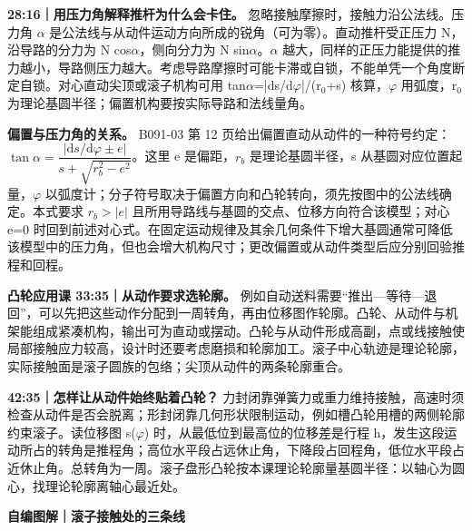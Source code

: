 \documentclass[zihao=5,a4paper,UTF8,fontset=fandol]{ctexart}
\begin{document}
\textbf{28:16｜用压力角解释推杆为什么会卡住。} 忽略接触摩擦时，接触力沿公法线。压力角 $\alpha$ 是公法线与从动件运动方向所成的锐角（可为零）。直动推杆受正压力 N，沿导路的分力为 N cos$\alpha$，侧向分力为 N sin$\alpha$。$\alpha$ 越大，同样的正压力能提供的推力越小，导路侧压力越大。考虑导路摩擦时可能卡滞或自锁，不能单凭一个角度断定自锁。对心直动尖顶或滚子机构可用 tan$\alpha$=|ds/d$\varphi$|/(r$_{0}$+s) 核算，$\varphi$ 用弧度，r$_{0}$ 为理论基圆半径；偏置机构要按实际导路和法线量角。


\textbf{偏置与压力角的关系。} B091-03 第 12 页给出偏置直动从动件的一种符号约定：$\tan\alpha=\dfrac{|\mathrm{d}s/\mathrm{d}\varphi\pm e|}{s+\sqrt{r_b^2-e^2}}$。这里 e 是偏距，$r_b$ 是理论基圆半径，s 从基圆对应位置起量，$\varphi$ 以弧度计；分子符号取决于偏置方向和凸轮转向，须先按图中的公法线确定。本式要求 $r_b>|e|$ 且所用导路线与基圆的交点、位移方向符合该模型；对心 e=0 时回到前述对心式。在固定运动规律及其余几何条件下增大基圆通常可降低该模型中的压力角，但也会增大机构尺寸；更改偏置或从动件类型后应分别回验推程和回程。


\textbf{凸轮应用课 33:35｜从动作要求选轮廓。} 例如自动送料需要“推出—等待—退回”，可以先把这些动作分配到一周转角，再由位移图作轮廓。凸轮、从动件与机架能组成紧凑机构，输出可为直动或摆动。凸轮与从动件形成高副，点或线接触使局部接触应力较高，设计时还要考虑磨损和轮廓加工。滚子中心轨迹是理论轮廓，实际接触面是滚子圆族的包络；尖顶从动件的两条轮廓重合。


\textbf{42:35｜怎样让从动件始终贴着凸轮？} 力封闭靠弹簧力或重力维持接触，高速时须检查从动件是否会脱离；形封闭靠几何形状限制运动，例如槽凸轮用槽的两侧轮廓约束滚子。读位移图 s($\varphi$) 时，从最低位到最高位的位移差是行程 h，发生这段运动所占的转角是推程角；高位水平段占远休止角，下降段占回程角，低位水平段占近休止角。总转角为一周。滚子盘形凸轮按本课理论轮廓量基圆半径：以轴心为圆心，找理论轮廓离轴心最近处。


\textbf{自编图解｜滚子接触处的三条线}


\begin{center}\end{center}
\end{document}
